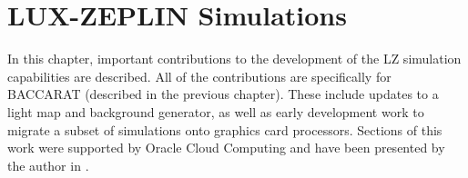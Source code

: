 \chapter{LUX-ZEPLIN Simulations}
\label{chap:lz_simulations}
\par
In this chapter, important contributions to the development of the LZ simulation capabilities are described.
All of the contributions are specifically for BACCARAT (described in the previous chapter).
These include updates to a light map and background generator, as well as early development work to migrate a subset of simulations onto graphics card processors.
Sections of this work were supported by Oracle Cloud Computing and have been presented by the author in \cite{se_poster_2018,se_poster_2019_summerschool,se_poster_2019_bristol,SEriksen_IoP_2021_talk_ref}.





